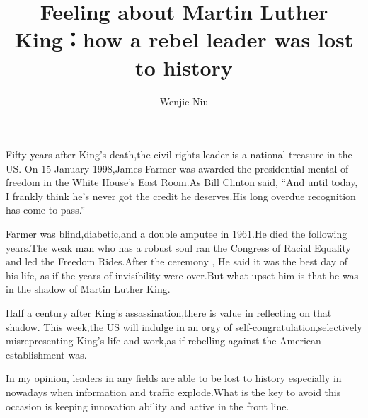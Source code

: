 \documentclass{article}
\author{Wenjie Niu}
\title{Feeling about Martin Luther King：how a rebel leader was lost to history}
\begin{document}
 
  \maketitle 
    Fifty years after King’s death,the civil rights leader is a national treasure in the US. On 15 January 1998,James Farmer was awarded the presidential mental of freedom in the White House’s East Room.As Bill Clinton said, “And until today, I frankly think he’s never got the credit he deserves.His long overdue recognition has come to pass.”

    Farmer was blind,diabetic,and a double amputee in 1961.He died the following years.The weak man who has a robust soul ran the Congress of Racial Equality and led the Freedom Rides.After the ceremony , He said it was the best day of his life, as if the years of invisibility were over.But what upset him is that he was in the shadow of Martin Luther King.

	    Half a century after King’s assassination,there is value in reflecting on that shadow. This week,the US will indulge in an orgy of self-congratulation,selectively misrepresenting King’s life and work,as if rebelling against the American establishment was.

		In my opinion, leaders in any fields are able to be lost to history especially in nowadays when information and traffic explode.What is the key to avoid this occasion is keeping innovation ability and active in the front line.
\end{document}
